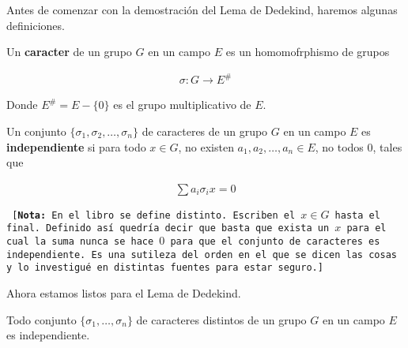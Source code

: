Antes de comenzar con la demostración del Lema de Dedekind, haremos
algunas definiciones.

\begin{definicion} 
    Un \textbf{caracter} de un grupo $G$ en un campo $E$ es un homomofrphismo de grupos
    
    \begin{align}
            \sigma: G \longrightarrow E^{\#}
    \end{align}
    
    Donde $E^{\#} = E - \{0\}$ es el grupo multiplicativo de $E$.
\end{definicion}

\begin{definicion}
    Un conjunto $\{\sigma_1 , \sigma_2, \dots, \sigma_n\}$ de caracteres de un grupo $G$ en un campo $E$ es
    \textbf{independiente} si para todo $x \in G$, no existen $a_1, a_2, \dots, a_n \in E$, no todos 0, tales que 
    
    \begin{align}
            \sum a_i \sigma_i{x} = 0 
    \end{align}\par\null
    
    \begin{sloppypar}
    \tiny
        \texttt{
                [\textbf{Nota:} En el libro se define distinto. 
                Escriben el $x \in G$ hasta el final. 
                Definido así quedría decir que basta que exista un $x$
                para el cual la suma nunca se hace $0$ para que el 
                conjunto de caracteres es independiente.                
                Es una sutileza del orden en el que se dicen las 
                cosas y lo investigué en distintas fuentes 
                para estar seguro.]}
    \normalsize
    \end{sloppypar}
\end{definicion}

Ahora estamos listos para el Lema de Dedekind.

\begin{lema}
    Todo conjunto $\{\sigma_1, \dots, \sigma_n\}$ de caracteres distintos de un grupo $G$ en un campo $E$ es independiente.
\end{lema}

